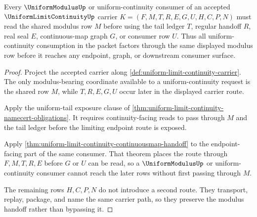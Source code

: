 \begin{theorem}
\label{thm:uniform-limit-continuity-modulus-handoff}
Every $\UniformModulusUp$ or uniform-continuity consumer of an accepted $\UniformLimitContinuityUp$ carrier $K=(F,M,T,R,E,G,U,H,C,P,N)$ must read the shared modulus row $M$ before using the tail ledger $T$, regular handoff $R$, real seal $E$, continuous-map graph $G$, or consumer row $U$. Thus all uniform-continuity consumption in the packet factors through the same displayed modulus row before it reaches any endpoint, graph, or downstream consumer surface.
\end{theorem}
\begin{proof}
Project the accepted carrier along \autoref{def:uniform-limit-continuity-carrier}. The only modulus-bearing coordinate available to a uniform-continuity request is the shared row $M$, while $T,R,E,G,U$ occur later in the displayed carrier route.

Apply the uniform-tail exposure clause of \autoref{thm:uniform-limit-continuity-namecert-obligations}. It requires continuity-facing reads to pass through $M$ and the tail ledger before the limiting endpoint route is exposed.

Apply \autoref{thm:uniform-limit-continuity-continuousmap-handoff} to the endpoint-facing part of the same consumer. That theorem places the route through $F,M,T,R,E$ before $G$ or $U$ can be read, so a $\UniformModulusUp$ or uniform-continuity consumer cannot reach the later rows without first passing through $M$.

The remaining rows $H,C,P,N$ do not introduce a second route. They transport, replay, package, and name the same carrier path, so they preserve the modulus handoff rather than bypassing it.
\end{proof}

